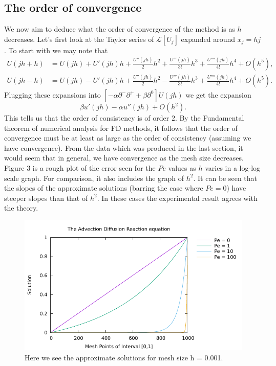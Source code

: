 \documentclass[10pt]{article}
\begin{document}
\subsection{The order of convergence}

We now aim to deduce what the order of convergence of the method is as $h$ decreases. Let's first look at the Taylor series of $\mathcal{L}[U_j]$ expanded around $x_j = hj$. To start with we may note that
\begin{align*}
    U(jh + h) &= U(jh) + U'(jh)h + \frac{U''(jh)}{2}h^2 + \frac{U'''(jh)}{3!}h^3 + \frac{U''''(jh)}{4!}h^4 + O(h^5), \\
    U(jh - h) &= U(jh) - U'(jh)h + \frac{U''(jh)}{2}h^2 - \frac{U'''(jh)}{3!}h^3 + \frac{U''''(jh)}{4!}h^4 + O(h^5).
\end{align*}
Plugging these expansions into $[-\alpha \partial^-\partial^+ + \beta \partial^0]U(jh)$ we get the expansion
\[ \beta u'(jh)  -\alpha u ''(jh) + O(h^2).  \]
This tells us that the order of consistency is of order $2$. By the Fundamental theorem of numerical analysis for FD methods, it follows that the order of convergence must be at least as large as the order of consistency (assuming we have convergence). From the data which was produced in the last section, it would seem that in general, we have convergence as the mesh size decreases. Figure 3 is a rough plot of the error seen for the $Pe$ values as $h$ varies in a log-log scale graph. For comparison, it also includes the graph of $h^2$. It can be seen that the slopes of the approximate solutions (barring the case where $Pe=0$) have steeper slopes than that of $h^2$. In these cases the experimental result agrees with the theory.

\clearpage

 \begin{figure}
 \begin{center}
    \includegraphics[width=1\textwidth]{function_1000}
  \end{center}
  \caption{Here we see the approximate solutions for mesh size h = 0.001.
  \label{fig:func_and_deriv}}
\end{figure}
\end{document}
